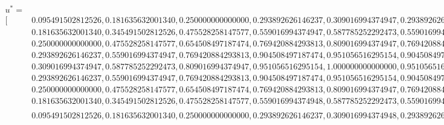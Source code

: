 \documentclass[10pt,a4paper]{article}
\begin{document}
\begin{align*}
u^*=&\\
[&0.095491502812526,0.181635632001340,0.250000000000000,0.293892626146237,0.309016994374947,0.293892626146237,0.250000000000000,0.181635632001340,0.095491502812526,\\
&0.181635632001340,0.345491502812526,0.475528258147577,0.559016994374947,0.587785252292473,0.559016994374947,0.475528258147577,0.345491502812526,0.181635632001340,\\
&0.250000000000000,0.475528258147577,0.654508497187474,0.769420884293813,0.809016994374947,0.769420884293813,0.654508497187474,0.475528258147577,0.250000000000000,\\
&0.293892626146237,0.559016994374947,0.769420884293813,0.904508497187474,0.951056516295154,0.904508497187474,0.769420884293813,0.559016994374948,0.293892626146237,\\
&0.309016994374947,0.587785252292473,0.809016994374947,0.951056516295154,1.000000000000000,0.951056516295154,0.809016994374947,0.587785252292473,0.309016994374948,\\
&0.293892626146237,0.559016994374947,0.769420884293813,0.904508497187474,0.951056516295154,0.904508497187474,0.769420884293813,0.559016994374948,0.293892626146237,\\
&0.250000000000000,0.475528258147577,0.654508497187474,0.769420884293813,0.809016994374947,0.769420884293813,0.654508497187474,0.475528258147577,0.250000000000000,\\
&0.181635632001340,0.345491502812526,0.475528258147577,0.559016994374948,0.587785252292473,0.559016994374948,0.475528258147577,0.345491502812526,0.181635632001340,\\
&0.095491502812526,0.181635632001340,0.250000000000000,0.293892626146237,0.309016994374948,0.293892626146237,0.250000000000000,0.181635632001340,0.095491502812526]^T
\end{align*}
\normalsize
\end{document}
